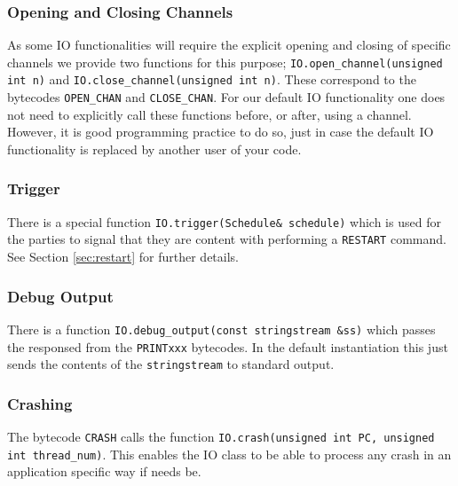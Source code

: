 \subsubsection{Opening and Closing Channels}
As some IO functionalities will require the explicit opening
and closing of specific channels we provide two functions
for this purpose;
\verb+IO.open_channel(unsigned int n)+
and
\verb+IO.close_channel(unsigned int n)+.
These correspond to the bytecodes \verb+OPEN_CHAN+ and
\verb+CLOSE_CHAN+.
For our default IO functionality one does not need to
explicitly call these functions before, or after,
using a channel.
However, it is good programming practice to do so, just
in case the default IO functionality is replaced by another
user of your code.

\subsubsection{Trigger}
There is a special function \verb+IO.trigger(Schedule& schedule)+ 
which is used for the parties to signal that they are content with
performing a \verb+RESTART+ command.
See Section \ref{sec:restart} for further details.

\subsubsection{Debug Output}
There is a function \verb+IO.debug_output(const stringstream &ss)+
which passes the responsed from the \verb+PRINTxxx+ bytecodes.
In the default instantiation this just sends the contents
of the \verb+stringstream+ to standard output.

\subsubsection{Crashing}
The bytecode \verb+CRASH+ calls the function 
\verb+IO.crash(unsigned int PC, unsigned int thread_num)+.
This enables the IO class to be able to process any crash
in an application specific way if needs be.

